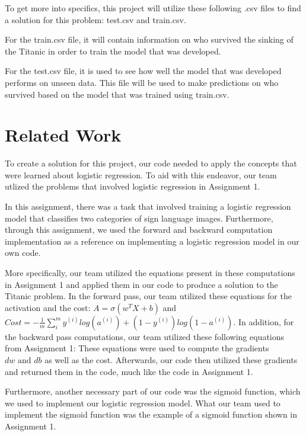 \documentclass{IEEE}
\begin{document}
To get more into specifics, this project will utilize these following .csv files to find a solution for this problem: test.csv and train.csv.


For the train.csv file, it will contain information on who survived the sinking of the Titanic in order to train the model that was developed.

For the test.csv file, it is used to see how well the model that was developed performs on unseen data. This file will be used to make predictions on who survived based on the model that was trained using train.csv.




\section{Related Work}

To create a solution for this project, our code needed to apply the concepts that were learned about logistic regression. To aid with this endeavor, our team utlized the problems that involved logistic regression in Assignment 1.

In this assignment, there was a task that involved training a logistic regression model that classifies two categories of sign language images. Furthermore, through this assignment, we used the forward and backward computation implementation as a reference on implementing a logistic regression model in our own code.

More specifically, our team utilized the equations present in these computations in Assignment 1 and applied them in our code to produce a solution to the Titanic problem. In the forward pass, our team utilized these equations for the activation and the cost: $A=\sigma (w^TX+b)$ and $Cost=-\frac{1}{m}\sum^m_i y^{(i)}log(a^{(i)})+(1-y^{(i)})log(1-a^{(i)})$. In addition, for the backward pass computations, our team utilized these following equations from Assignment 1:
These equations were used to compute the gradients $dw \text{ and } db$ as well as the cost. Afterwards, our code then utilized these gradients and returned them in the code, much like the code in Assignment 1.

Furthermore, another necessary part of our code was the sigmoid function, which we used to implement our logistic regression model. What our team used to implement the sigmoid function was the example of a sigmoid function shown in Assignment 1.
\end{document}
